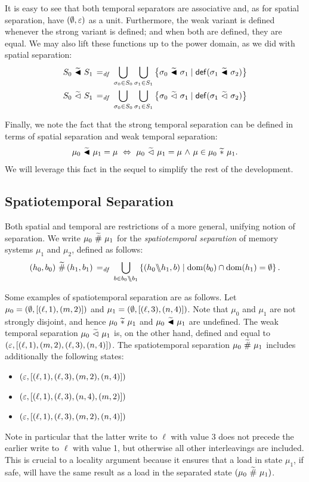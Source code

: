 \documentclass[11pt]{report}
\begin{document}
It is easy to see that both temporal separators are associative and, as for spatial separation, have $(\operatorname{\emptyset},\varepsilon)$ as a unit. Furthermore, the weak variant is defined whenever the strong variant is defined; and when both are defined, they are equal. We may also lift these functions up to the power domain, as we did with spatial separation: \begin{align*}
    S_0 \operatorname{\,\widetilde{\blacktriangleleft}\,} S_1 \operatorname{\;=_{\mathit{df}}\;} \bigcup_{\sigma_0 \in S_0} \bigcup_{\sigma_1 \in S_1} \left\lbrace \sigma_0 \operatorname{\,\widetilde{\blacktriangleleft}\,} \sigma_1 \mid \mathsf{def}(\sigma_1 \operatorname{\,\widetilde{\blacktriangleleft}\,} \sigma_2) \right\rbrace \\ 
    S_0 \operatorname{\,\widetilde{\vartriangleleft}\,} S_1 \operatorname{\;=_{\mathit{df}}\;} \bigcup_{\sigma_0 \in S_0} \bigcup_{\sigma_1 \in S_1} \left\lbrace \sigma_0 \operatorname{\,\widetilde{\vartriangleleft}\,} \sigma_1 \mid \mathsf{def}(\sigma_1 \operatorname{\,\widetilde{\vartriangleleft}\,} \sigma_2) \right\rbrace
\end{align*}

Finally, we note the fact that the strong temporal separation can be defined in terms of spatial separation and weak temporal separation: \[ \mu_0 \operatorname{\,\widetilde{\blacktriangleleft}\,} \mu_1 = \mu \,\,\Leftrightarrow\,\, \mu_0 \operatorname{\,\widetilde{\vartriangleleft}\,} \mu_1 = \mu \operatorname{\,\wedge\,} \mu \in \mu_0 \operatorname{\,\widetilde{\ast}\,} \mu_1.\] We will leverage this fact in the sequel to simplify the rest of the development. 

\subsection{Spatiotemporal Separation}
\label{sec:sequential-spatiotemporal-separation}

Both spatial and temporal are restrictions of a more general, unifying notion of separation. We write $\mu_0 \operatorname{\,\widetilde{\#}\,} \mu_1$ for the \emph{spatiotemporal separation} of memory systems $\mu_1$ and $\mu_2$, defined as follows: \[ (h_0,b_0) \operatorname{\,\widetilde{\#}\,} (h_1,b_1) \operatorname{\;=_{\mathit{df}}\;} \bigcup_{b \in b_0 \backslash\!\!\backslash b_1} \left\lbrace (h_0 \backslash\!\!\backslash h_1, b) \mid \operatorname{\mathrm{dom}}(b_0) \cap \operatorname{\mathrm{dom}}(h_1) = \operatorname{\emptyset} \right\rbrace.\] 

Some examples of spatiotemporal separation are as follows. Let $\mu_0 = (\operatorname{\emptyset},\left[(\ell,1),(m,2)\right])$ and $\mu_1 = (\operatorname{\emptyset},\left[(\ell,3),(n,4)\right])$. Note that $\mu_0$ and $\mu_1$ are not strongly disjoint, and hence $\mu_0 \operatorname{\,\widetilde{\ast}\,} \mu_1$ and $\mu_0 \operatorname{\,\widetilde{\blacktriangleleft}\,} \mu_1$ are undefined. The weak temporal separation $\mu_0 \operatorname{\,\widetilde{\vartriangleleft}\,} \mu_1$ is, on the other hand, defined and equal to $(\varepsilon,\left[(\ell,1),(m,2),(\ell,3),(n,4)\right])$. The spatiotemporal separation $\mu_0 \operatorname{\,\widetilde{\#}\,} \mu_1$ includes additionally the following states: \begin{itemize} \item $(\varepsilon,\left[(\ell,1),(\ell,3),(m,2),(n,4)\right])$
  \item $(\varepsilon,\left[(\ell,1),(\ell,3),(n,4),(m,2)\right])$
  \item $(\varepsilon,\left[(\ell,1),(\ell,3),(m,2),(n,4)\right])$
\end{itemize} Note in particular that the latter write to $\ell$ with value $3$ does not precede the earlier write to $\ell$ with value 1, but otherwise all other interleavings are included. This is crucial to a locality argument because it ensures that a load in state $\mu_1$, if safe, will have the same result as a load in the separated state $(\mu_0 \operatorname{\,\widetilde{\#}\,} \mu_1)$. 
\end{document}
